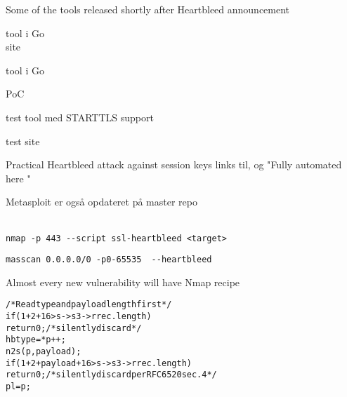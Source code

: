 \documentclass[20pt,landscape,a4paper,footrule]{foils}
\begin{document}
\centerline{Some of the tools released shortly after Heartbleed announcement}
\begin{list2}
\item {} tool i Go\\
site 
\item {} tool i Go
\item {} PoC
\item {} test tool med STARTTLS support
\item {} test site
\item {} Practical Heartbleed attack against session keys links til,  og "Fully automated here "\\ 

\item Metasploit er også opdateret på master repo\\ \\
\end{list2}




\begin{list1}
\item \verb+nmap -p 443 --script ssl-heartbleed <target>+\\
\item \verb+masscan 0.0.0.0/0 -p0-65535  --heartbleed+\\
\end{list1}

\centerline{Almost every new vulnerability will have Nmap recipe}


\begin{alltt}
  /* Read type and payload length first */
    if (1 + 2 + 16 > s->s3->rrec.length)
        return 0; /* silently discard */
    hbtype = *p++;
    n2s(p, payload);
    if (1 + 2 + payload + 16 > s->s3->rrec.length)
        return 0; /* silently discard per RFC 6520 sec. 4 */
    pl = p;
\end{alltt}
\end{document}
